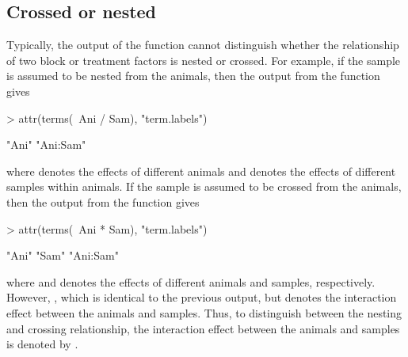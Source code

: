 \documentclass[article]{jss}
\begin{document}
\subsection{Crossed or nested}
Typically, the output of the  function cannot distinguish whether the relationship of two block or treatment factors is nested or crossed. For example, if the sample is assumed to be nested from the animals, then the output from the  function gives
\begin{CodeChunk}
\begin{CodeInput}
> attr(terms(~Ani / Sam), "term.labels")
\end{CodeInput}
\begin{CodeOutput}
[1] "Ani"     "Ani:Sam"
\end{CodeOutput}
\end{CodeChunk}
where  denotes the effects of different animals and  denotes the effects of different samples within animals. If the sample is assumed to be crossed from the animals, then the output from the  function gives
\begin{CodeChunk}
\begin{CodeInput}
> attr(terms(~Ani * Sam), "term.labels")
\end{CodeInput}
\begin{CodeOutput}
[1] "Ani"     "Sam"     "Ani:Sam"
\end{CodeOutput}
\end{CodeChunk}
where  and  denotes the effects of different animals and samples, respectively. However, , which is identical to the previous output, but denotes the interaction effect between the animals and samples. Thus, to distinguish between the nesting and crossing relationship, the interaction effect between the animals and samples is denoted by . 
\end{document}
